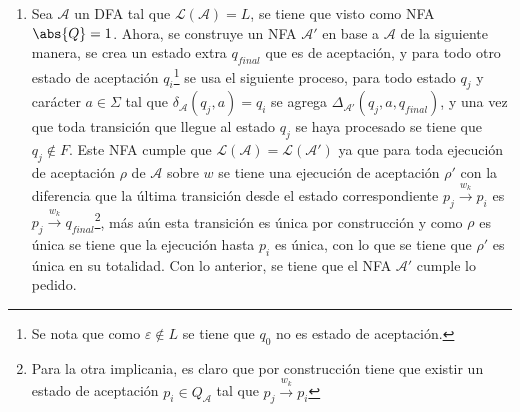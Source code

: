 \documentclass{homework}
\begin{document}
\begin{p1}
\begin{sol}
\begin{enumerate}
            \item Sea \(\mathcal{A}\) un DFA tal que \(\mathcal{L}(\mathcal{A})=L\), se tiene que visto como NFA \(\abs{Q}=1\). Ahora, se construye un NFA \(\mathcal{A}'\) en base a \(\mathcal{A}\) de la siguiente manera, se crea un estado extra \(q_{final}\) que es de aceptación, y para todo otro estado de aceptación \(q_i\)\footnote{Se nota que como \(\varepsilon\notin L\) se tiene que \(q_0\) no es estado de aceptación.} se usa el siguiente proceso, para todo estado \(q_j\) y carácter \(a\in\Sigma\)  tal que \(\delta_{\mathcal{A}}(q_j,a)=q_i\) se agrega \(\Delta_{\mathcal{A}'}(q_j,a,q_{final})\), y una vez que toda transición que llegue al estado \(q_j\) se haya procesado se tiene que \(q_j\notin F\). Este NFA cumple que \(\mathcal{L}(\mathcal{A})=\mathcal{L}(\mathcal{A}')\) ya que para toda ejecución de aceptación \(\rho\) de \(\mathcal{A}\) sobre \(w\) se tiene una ejecución de aceptación \(\rho'\) con la diferencia que la última transición desde el estado correspondiente \(p_j\xrightarrow{w_k}p_i\) es \(p_j\xrightarrow{w_k}q_{final}\)\footnote{Para la otra implicania, es claro que por construcción tiene que existir un estado de aceptación \(p_i\in Q_\mathcal{A}\) tal que \(p_j\xrightarrow{w_k}p_i\)}, más aún esta transición es única por construcción y como \(\rho\) es única se tiene que la ejecución hasta \(p_i\) es única, con lo que se tiene que \(\rho'\) es única en su totalidad. Con lo anterior, se tiene que el NFA \(\mathcal{A}'\) cumple lo pedido.
        \end{enumerate}
    \end{sol}
\end{p1}
\end{document}
